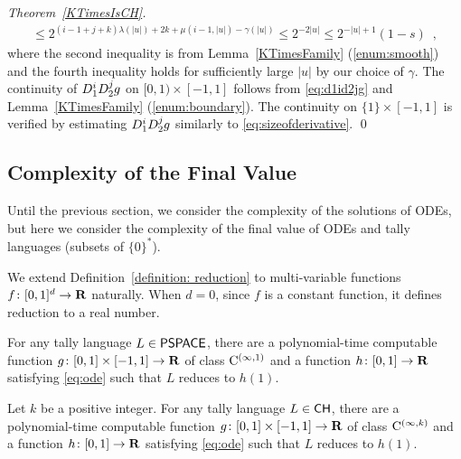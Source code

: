 \begin{proof}[Theorem~\ref{KTimesIsCH}]
\begin{align}
  \le 2^{(i-1+j+k)\lambda(|u|) + 2k + \mu(i-1, |u|)  - \gamma(|u|)}
  \le 2^{-2 \lvert u \rvert}
  \le 2^{-\lvert u \rvert + 1} (1 - s) \enspace , 
  \label{eq:sizeofderivative}
 \end{align}
where the second inequality is from 
Lemma~\ref{KTimesFamily} (\ref{enum:smooth})
and the fourth inequality holds for sufficiently large $\lvert u \rvert$
by our choice of $\gamma$. 
The continuity of $D _1 ^i D _2 ^j g$ on $[0,1) \times [-1, 1]$ follows
from \eqref{eq:d1id2jg} and Lemma~\ref{KTimesFamily} (\ref{enum:boundary}).
The continuity on $\{1\} \times [-1, 1]$ is verified by 
estimating $D_1^{i} D_2^{j} g$ similarly to \eqref{eq:sizeofderivative}. 
\qed
\end{proof} 



\subsection{Complexity of the Final Value}
Until the previous section, we consider the complexity of the solutions of ODEs,
but here we consider the complexity of the final value of ODEs and
tally languages (subsets of $\{0\}^*$).

We extend Definition~\ref{definition: reduction} 
to multi-variable functions $f \colon [0, 1]^d \to \mathbf R$ naturally.
When $d = 0$, since $f$ is a constant function,
it defines reduction to a real number.


\begin{theorem}
For any tally language $L \in \mathsf{PSPACE}$,
there are a polynomial-time computable function
$g \colon [0,1] \times [-1,1] \to \mathbf R$ 
of class $\mathrm C ^{(\infty, 1)}$ and 
a function $h \colon [0,1] \to \mathbf R$
satisfying \eqref{eq:ode} 
such that $L$ reduces to $h(1)$.
\end{theorem}

\begin{theorem}
Let $k$ be a positive integer. 
For any tally language $L \in \mathsf{CH}$,
there are a polynomial-time computable function
$g \colon [0,1] \times [-1,1] \to \mathbf R$ 
of class $\mathrm C ^{(\infty, k)}$ and 
a function $h \colon [0,1] \to \mathbf R$
satisfying \eqref{eq:ode} 
such that $L$ reduces to $h(1)$.
\end{theorem}

